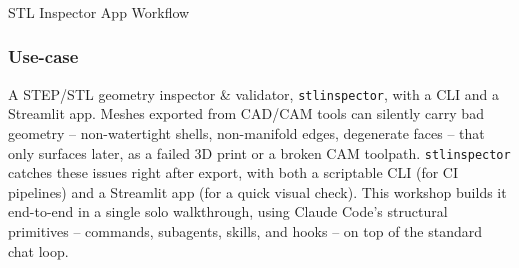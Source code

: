 \begin{frame}[fragile]\frametitle{}

\begin{center}
{\Large STL Inspector App Workflow}
\end{center}
\end{frame}

\begin{frame}[fragile]\frametitle{Use-case}
A STEP/STL geometry inspector \& validator, \texttt{stlinspector}, with a CLI and a Streamlit app. Meshes exported from CAD/CAM tools can silently carry bad geometry -- non-watertight shells, non-manifold edges, degenerate faces -- that only surfaces later, as a failed 3D print or a broken CAM toolpath. \texttt{stlinspector} catches these issues right after export, with both a scriptable CLI (for CI pipelines) and a Streamlit app (for a quick visual check). This workshop builds it end-to-end in a single solo walkthrough, using Claude Code's structural primitives -- commands, subagents, skills, and hooks -- on top of the standard chat loop.



\end{frame}


